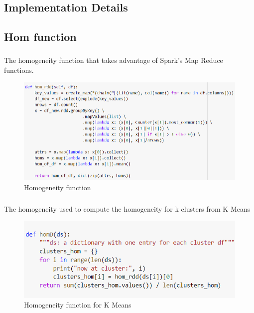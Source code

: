 \documentclass[sigconf]{acmart}
\begin{document}
\begin{appendices}
\section{Implementation Details}
\newpage
\subsection{Hom function} \label{HomFunctionAppendix}
\subsubsection{}
The homogeneity function that takes advantage of Spark's Map Reduce functions.
\begin{figure}[h!]
    \centering
    \includegraphics[scale=0.52]{images/Full_Hom_Rdd.png}
    \caption{Homogeneity function}
    \label{fig:FullHomRdd}
\end{figure}

\subsubsection{}
The homogeneity used to compute the homogeneity for k clusters from K Means
\begin{figure}[h!]
    \centering
    \includegraphics[scale=0.4]{images/HomKMeans.png}
    \caption{Homogeneity function for K Means}
    \label{fig:HomKMeans}
\end{figure}
\end{appendices}
\end{document}
